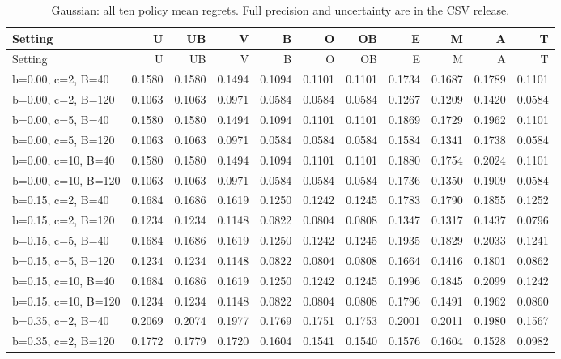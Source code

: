 \begin{landscape}
\small
{}
\begin{longtable}{lrrrrrrrrrr}
\caption{Gaussian: all ten policy mean regrets. Full precision and uncertainty are in the CSV release.}\\
\toprule
Setting & U & UB & V & B & O & OB & E & M & A & T \\
\midrule
\endfirsthead
\toprule
Setting & U & UB & V & B & O & OB & E & M & A & T \\
\midrule
\endhead
b=0.00, c=2, B=40 & 0.1580 & 0.1580 & 0.1494 & 0.1094 & 0.1101 & 0.1101 & 0.1734 & 0.1687 & 0.1789 & 0.1101 \\
b=0.00, c=2, B=120 & 0.1063 & 0.1063 & 0.0971 & 0.0584 & 0.0584 & 0.0584 & 0.1267 & 0.1209 & 0.1420 & 0.0584 \\
b=0.00, c=5, B=40 & 0.1580 & 0.1580 & 0.1494 & 0.1094 & 0.1101 & 0.1101 & 0.1869 & 0.1729 & 0.1962 & 0.1101 \\
b=0.00, c=5, B=120 & 0.1063 & 0.1063 & 0.0971 & 0.0584 & 0.0584 & 0.0584 & 0.1584 & 0.1341 & 0.1738 & 0.0584 \\
b=0.00, c=10, B=40 & 0.1580 & 0.1580 & 0.1494 & 0.1094 & 0.1101 & 0.1101 & 0.1880 & 0.1754 & 0.2024 & 0.1101 \\
b=0.00, c=10, B=120 & 0.1063 & 0.1063 & 0.0971 & 0.0584 & 0.0584 & 0.0584 & 0.1736 & 0.1350 & 0.1909 & 0.0584 \\
b=0.15, c=2, B=40 & 0.1684 & 0.1686 & 0.1619 & 0.1250 & 0.1242 & 0.1245 & 0.1783 & 0.1790 & 0.1855 & 0.1252 \\
b=0.15, c=2, B=120 & 0.1234 & 0.1234 & 0.1148 & 0.0822 & 0.0804 & 0.0808 & 0.1347 & 0.1317 & 0.1437 & 0.0796 \\
b=0.15, c=5, B=40 & 0.1684 & 0.1686 & 0.1619 & 0.1250 & 0.1242 & 0.1245 & 0.1935 & 0.1829 & 0.2033 & 0.1241 \\
b=0.15, c=5, B=120 & 0.1234 & 0.1234 & 0.1148 & 0.0822 & 0.0804 & 0.0808 & 0.1664 & 0.1416 & 0.1801 & 0.0862 \\
b=0.15, c=10, B=40 & 0.1684 & 0.1686 & 0.1619 & 0.1250 & 0.1242 & 0.1245 & 0.1996 & 0.1845 & 0.2099 & 0.1242 \\
b=0.15, c=10, B=120 & 0.1234 & 0.1234 & 0.1148 & 0.0822 & 0.0804 & 0.0808 & 0.1796 & 0.1491 & 0.1962 & 0.0860 \\
b=0.35, c=2, B=40 & 0.2069 & 0.2074 & 0.1977 & 0.1769 & 0.1751 & 0.1753 & 0.2001 & 0.2011 & 0.1980 & 0.1567 \\
b=0.35, c=2, B=120 & 0.1772 & 0.1779 & 0.1720 & 0.1604 & 0.1541 & 0.1540 & 0.1576 & 0.1604 & 0.1528 & 0.0982 \\

\end{longtable}
\end{landscape}
